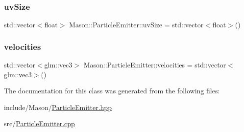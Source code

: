 \subsubsection{\texorpdfstring{uv\+Size}{uvSize}}
{\footnotesize\ttfamily std\+::vector$<$float$>$ Mason\+::\+Particle\+Emitter\+::uv\+Size = std\+::vector$<$float$>$()\hspace{0.3cm}{\ttfamily [protected]}}

\hypertarget{class_mason_1_1_particle_emitter_aa72403d590c4528e1a1d9dbf4bc3dfd3}{}\label{class_mason_1_1_particle_emitter_aa72403d590c4528e1a1d9dbf4bc3dfd3} 
\subsubsection{\texorpdfstring{velocities}{velocities}}
{\footnotesize\ttfamily std\+::vector$<$glm\+::vec3$>$ Mason\+::\+Particle\+Emitter\+::velocities = std\+::vector$<$glm\+::vec3$>$()\hspace{0.3cm}{\ttfamily [protected]}}



The documentation for this class was generated from the following files\+:\begin{DoxyCompactItemize}
\item 
include/\+Mason/\hyperlink{_particle_emitter_8hpp}{Particle\+Emitter.\+hpp}\item 
src/\hyperlink{_particle_emitter_8cpp}{Particle\+Emitter.\+cpp}\end{DoxyCompactItemize}
